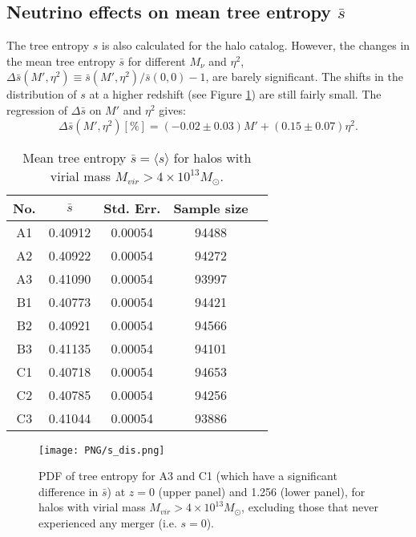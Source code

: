 \subsection{Neutrino effects on mean tree entropy $\bar s$}
The tree entropy $s$ is also calculated for the halo catalog. However, the changes in the mean tree entropy $\bar s$ for different $M_\nu$ and $\eta^2$, $\Delta {\bar s} (M', \eta^2) \equiv \bar s(M', \eta^2) / \bar s (0, 0)-1$, are barely significant. 
The shifts in the distribution of $s$ at a higher redshift (see Figure \ref{fig:s_dis}) are still fairly small.
The regression of $\Delta \bar s$ on $M'$ and $\eta^2$ gives:
\begin{equation}
    \Delta \bar s(M',\eta^2) [\%] = (-0.02\pm0.03) M' + (0.15\pm0.07) \eta^2.
\end{equation}
\begin{table}[!ht]
		\begin{center}
		\begin{tabular}{|c|c|c|c|c|}
			\hline
			No. & $\bar s$ & Std. Err. & Sample size \\
			\hline
			A1 & 0.40912 & 0.00054 & 94488  \\
			A2 & 0.40922 & 0.00054 & 94272  \\
			A3 & 0.41090 & 0.00054 & 93997  \\
			\hline
			B1 & 0.40773 & 0.00054 & 94421  \\
			B2 & 0.40921 & 0.00054 & 94566  \\
			B3 & 0.41135 & 0.00054 & 94101  \\
			\hline
			C1 & 0.40718 & 0.00054 & 94653  \\
			C2 & 0.40785 & 0.00054 & 94256 \\
			C3 & 0.41044 & 0.00054 & 93886  \\		
			\hline
		\end{tabular}
		\caption{Mean tree entropy $\bar s = \langle s \rangle$ for halos with virial mass $M_{vir} > 4\times10^{13}M_\odot $.}
		\label{tab:entropy_dis}
		\end{center}
\end{table}
\begin{figure}[!h]
		\begin{center}%
		\texttt{[image: PNG/s\_dis.png]}
		\caption{\label{fig:s_dis}PDF of tree entropy for A3 and C1 (which have a significant difference in $\bar s$) at $z=0$ (upper panel) and 1.256 (lower panel), for halos with virial mass $M_{vir}>4\times10^{13} M_\odot$, excluding those that never experienced any merger (i.e. $s=0$).}
		\end{center}
\end{figure}


